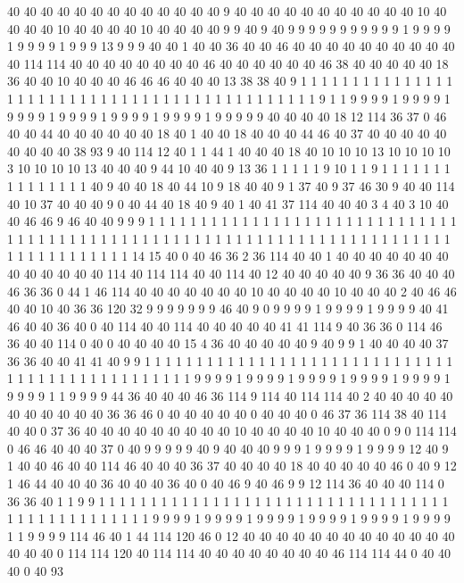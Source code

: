 40 40 40 40 40 40 40 40 40 40 40 40 40 9 40 40 40 40 40 40
40 40 40 40 40 10 40 40 40 40 10 40 40 40 40 10 40 40 40 40
9 9 40 9 40 9 9 9 9 9 9 9 9 9 9 9 1 9 9 9
9 1 9 9 9 9 1 9 9 9 13 9 9 9 40 40 1 40 40 36
40 40 46 40 40 40 40 40 40 40 40 40 40 40 114 114 40 40 40 40
40 40 40 40 46 40 40 40 40 40 40 46 38 40 40 40 40 40 18 36
40 40 10 40 40 40 46 46 46 40 40 40 13 38 38 40 9 1 1 1
1 1 1 1 1 1 1 1 1 1 1 1 1 1 1 1 1 1 1 1
1 1 1 1 1 1 1 1 1 1 1 1 1 1 1 1 1 1 1 1
1 1 9 1 1 9 9 9 9 1 9 9 9 9 1 9 9 9 9 1
9 9 9 9 1 9 9 9 9 1 9 9 9 9 1 9 9 9 9 9
40 40 40 40 18 12 114 36 37 0 46 40 40 44 40 40 40 40 40 40
18 40 1 40 40 18 40 40 40 44 46 40 37 40 40 40 40 40 40 40
40 40 38 93 9 40 114 12 40 1 1 44 1 40 40 40 18 40 10 10
10 13 10 10 10 10 3 10 10 10 10 13 40 40 40 9 44 10 40 40
9 13 36 1 1 1 1 1 9 10 1 1 9 1 1 1 1 1 1 1
1 1 1 1 1 1 1 1 40 9 40 40 18 40 44 10 9 18 40 40
9 1 37 40 9 37 46 30 9 40 40 114 40 10 37 40 40 40 9 0
40 44 40 18 40 9 40 1 40 41 37 114 40 40 40 3 4 40 3 10
40 40 46 46 9 46 40 40 9 9 9 1 1 1 1 1 1 1 1 1
1 1 1 1 1 1 1 1 1 1 1 1 1 1 1 1 1 1 1 1
1 1 1 1 1 1 1 1 1 1 1 1 1 1 1 1 1 1 1 1
1 1 1 1 1 1 1 1 1 1 1 1 1 1 1 1 1 1 1 1
1 1 1 1 1 1 1 1 1 1 1 1 1 1 1 1 14 15 40 0
40 46 36 2 36 114 40 40 1 40 40 40 40 40 40 40 40 40 40 40
40 40 114 40 114 114 40 40 114 40 12 40 40 40 40 40 9 36 36 40
40 40 46 36 36 0 44 1 46 114 40 40 40 40 40 40 40 10 40 40
40 40 10 40 40 40 2 40 46 46 40 40 10 40 36 36 120 32 9 9
9 9 9 9 9 46 40 9 0 9 9 9 9 1 9 9 9 9 1 9
9 9 9 40 41 46 40 40 36 40 0 40 114 40 40 114 40 40 40 40
40 41 41 114 9 40 36 36 0 114 46 36 40 40 114 0 40 0 40 40
40 40 15 4 36 40 40 40 40 40 9 40 9 9 1 40 40 40 40 37
36 36 40 40 41 41 40 9 9 1 1 1 1 1 1 1 1 1 1 1
1 1 1 1 1 1 1 1 1 1 1 1 1 1 1 1 1 1 1 1
1 1 1 1 1 1 1 1 1 1 1 1 1 1 1 1 1 9 9 9
9 1 9 9 9 9 1 9 9 9 9 1 9 9 9 9 1 9 9 9
9 1 9 9 9 9 1 1 9 9 9 9 44 36 40 40 40 46 36 114
9 114 40 114 114 40 2 40 40 40 40 40 40 40 40 40 40 40 36 36
46 0 40 40 40 40 40 0 40 40 40 0 46 37 36 114 38 40 114 40
40 0 37 36 40 40 40 40 40 40 40 40 40 10 40 40 40 40 10 40
40 40 0 9 0 114 114 0 46 46 40 40 40 37 0 40 9 9 9 9
9 40 9 40 40 40 9 9 9 1 9 9 9 9 1 9 9 9 9 12
40 9 1 40 40 46 40 40 114 46 40 40 40 36 37 40 40 40 40 18
40 40 40 40 40 46 0 40 9 12 1 46 44 40 40 40 36 40 40 40
36 40 0 40 46 9 40 46 9 9 12 114 36 40 40 40 114 0 36 36
40 1 1 9 9 1 1 1 1 1 1 1 1 1 1 1 1 1 1 1
1 1 1 1 1 1 1 1 1 1 1 1 1 1 1 1 1 1 1 1
1 1 1 1 1 1 1 1 1 1 1 1 1 9 9 9 9 1 9 9
9 9 1 9 9 9 9 1 9 9 9 9 1 9 9 9 9 1 9 9
9 9 1 1 9 9 9 9 114 46 40 1 44 114 120 46 0 12 40 40
40 40 40 40 40 40 40 40 40 40 40 40 40 40 0 114 114 120 40 114
114 40 40 40 40 40 40 40 40 46 114 114 44 0 40 40 40 0 40 93
